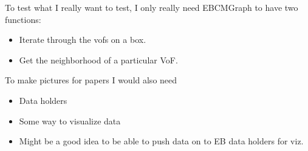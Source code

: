 
To test what I really want to test, I only really need EBCMGraph to have two functions:
\begin{itemize}
\item Iterate through the vofs on a box.
\item Get the neighborhood of a particular VoF.
\end{itemize}
To make pictures for papers I would also need
\begin{itemize}
\item Data holders
\item Some way to visualize data
\item Might be a good idea to be able to push data on to EB data
  holders for viz.
\end{itemize}  
